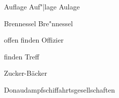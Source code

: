 \documentclass{article}
\begin{document}




Auflage Auf"|lage  Aulage

Brennessel Bre"nnessel

offen finden Offizier

finden Treff

Zucker-Bäcker


Donaudampfschiffahrtsgesellschaften

\end{document}
